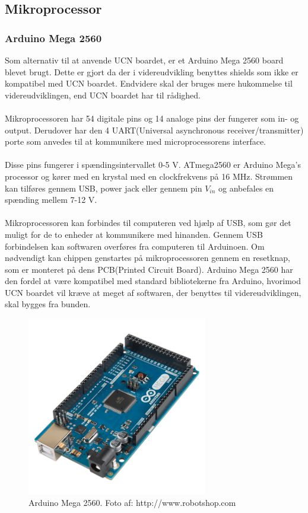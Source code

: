 \subsection{Mikroprocessor}
\subsubsection{Arduino Mega 2560}
Som alternativ til at anvende UCN boardet, er et Arduino Mega 2560 board blevet brugt. Dette er gjort da der i videreudvikling benyttes shields som ikke er kompatibel med UCN boardet. Endvidere skal der bruges mere hukommelse til videreudviklingen, end UCN boardet har til rådighed.
\\
\\
Mikroprocessoren har 54 digitale pins og 14 analoge pins der fungerer som in- og output. Derudover har den 4 UART(Universal asynchronous receiver/transmitter) porte som anvedes til at kommunikere med microprocessorens interface.
\\
\\
Disse pins fungerer i spændingsintervallet 0-5 V. ATmega2560 er Arduino Mega's processor og kører med en krystal med en clockfrekvens på 16 MHz. Strømmen kan tilføres gennem USB, power jack eller gennem pin $V_{in}$ og anbefales en spænding mellem 7-12 V. 
\\
\\
Mikroprocessoren kan forbindes til computeren ved hjælp af USB, som gør det muligt for de to enheder at kommunikere med hinanden. Gennem USB forbindelsen kan softwaren overføres fra computeren til Arduinoen. Om nødvendigt kan chippen genstartes på mikroprocessoren gennem en resetknap, som er monteret på dens PCB(Printed Circuit Board).
\newline
\newline
Arduino Mega 2560 har den fordel at være kompatibel med standard bibliotekerne fra Arduino, hvorimod UCN boardet vil kræve at meget af softwaren, der benyttes til videreudviklingen, skal bygges fra bunden.

\begin{figure}[h!]
  \centering
  \includegraphics[width=0.7\textwidth]{figures/arduinoMega.jpg}
  \caption{Arduino Mega 2560. Foto af:  http://www.robotshop.com}
  \label{arduino2569}
\end{figure} 

\newpage



